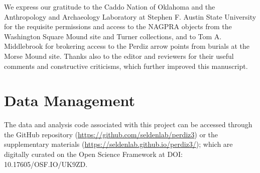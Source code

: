\documentclass[smallextended]{svjour3}       %
\begin{document}
We express our gratitude to the Caddo Nation of Oklahoma and the
Anthropology and Archaeology Laboratory at Stephen F. Austin State
University for the requisite permissions and access to the NAGPRA
objects from the Washington Square Mound site and Turner collections,
and to Tom A. Middlebrook for brokering access to the Perdiz arrow
points from burials at the Morse Mound site. Thanks also to the editor
and reviewers for their useful comments and constructive criticisms,
which further improved this manuscript.

\hypertarget{data-management}{%
\section*{Data Management}\label{data-management}}

The data and analysis code associated with this project can be accessed
through the GitHub repository
(\url{https://github.com/seldenlab/perdiz3}) or the supplementary
materials (\url{https://seldenlab.github.io/perdiz3/}); which are
digitally curated on the Open Science Framework at \newline DOI:
10.17605/OSF.IO/UK9ZD.




\end{document}
